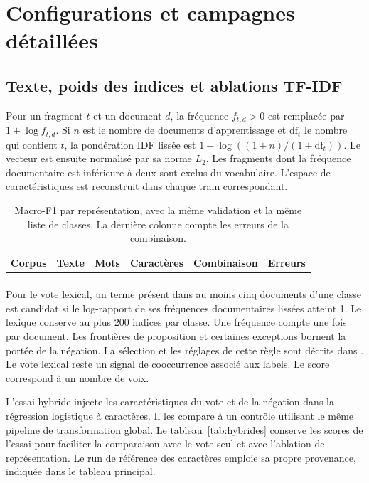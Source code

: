 \section{Configurations et campagnes détaillées}\label{ann:campagnes}

\subsection{Texte, poids des indices et ablations TF-IDF}
Pour un fragment $t$ et un document $d$, la fréquence $f_{t,d}>0$ est remplacée par $1+\log f_{t,d}$. Si $n$ est le nombre de documents d’apprentissage et $\mathrm{df}_t$ le nombre qui contient $t$, la pondération IDF lissée est $1+\log((1+n)/(1+\mathrm{df}_t))$. Le vecteur est ensuite normalisé par sa norme $L_2$. Les fragments dont la fréquence documentaire est inférieure à deux sont exclus du vocabulaire. L’espace de caractéristiques est reconstruit dans chaque train correspondant.

\begin{table}[htbp]
\centering\small
\caption{Macro-F1 par représentation, avec la même validation et la même liste de classes. La dernière colonne compte les erreurs de la combinaison.}\label{tab:repr-detail}
\begin{tabularx}{\linewidth}{@{}lYrrrr@{}}
\toprule
Corpus & Texte & Mots & Caractères & Combinaison & Erreurs \\
\midrule
{}
\bottomrule
\end{tabularx}
\end{table}

Pour le vote lexical, un terme présent dans au moins cinq documents d’une classe est candidat si le log-rapport de ses fréquences documentaires lissées atteint 1. Le lexique conserve au plus 200 indices par classe. Une fréquence compte une fois par document. Les frontières de proposition et certaines exceptions bornent la portée de la négation. La sélection et les réglages de cette règle sont décrits dans . Le vote lexical reste un signal de cooccurrence associé aux labels. Le score correspond à un nombre de voix.

L’essai hybride injecte les caractéristiques du vote et de la négation dans la régression logistique à caractères. Il les compare à un contrôle utilisant le même pipeline de transformation global. Le tableau~\ref{tab:hybrides} conserve les scores de l’essai pour faciliter la comparaison avec le vote seul et avec l’ablation de représentation. Le run de référence des caractères emploie sa propre provenance, indiquée dans le tableau principal.

